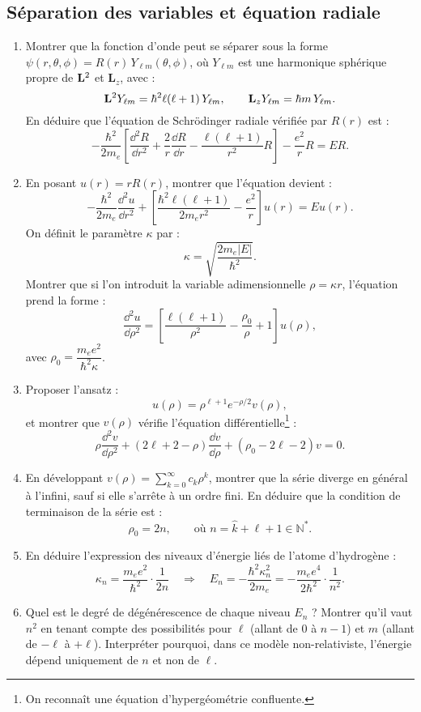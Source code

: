\documentclass[a4paper,10pt]{report}
\begin{document}
\subsection{Séparation des variables et équation radiale}
\begin{enumerate}
	\item Montrer que la fonction d'onde peut se séparer sous la forme $\psi(r,\theta,\phi) = R(r)\, Y_{\ell m}(\theta,\phi)$, où $Y_{\ell m}$ est une harmonique sphérique propre de $\vb{L}^2$ et $\textbf{L}_z$, avec :
	\[
	\vb{L}^2 Y_{\ell m} = \hbar^2 \ell(\ell+1)\, Y_{\ell m}, \qquad \textbf{L}_z Y_{\ell m} = \hbar m\, Y_{\ell m}.
	\]
	En déduire que l’équation de Schrödinger radiale vérifiée par $R(r)$ est :
	\[
	-\frac{\hbar^2}{2m_e} \left[ \frac{\dd^2R}{\dd r^2} + \frac{2}{r}\frac{\dd R}{\dd r} - \frac{\ell(\ell+1)}{r^2} R \right] - \frac{e^2}{r} R = E R.
	\]
	
	\item En posant $u(r) = r R(r)$, montrer que l'équation devient :
	\[
	-\frac{\hbar^2}{2m_e} \frac{\dd ^2u}{\dd r^2} + \left[ \frac{\hbar^2 \ell(\ell+1)}{2m_e r^2} - \frac{e^2}{r} \right] u(r) = E u(r).
	\]
On définit le paramètre $\kappa$ par :
	\[
	\kappa = \sqrt{\frac{2m_e |E|}{\hbar^2}}.
	\]
	Montrer que si l’on introduit la variable adimensionnelle $\rho = \kappa r$, l’équation prend la forme :
	\[
	\frac{\dd ^2 u}{\dd \rho^2} = \left[ \frac{\ell(\ell+1)}{\rho^2} - \frac{\rho_0}{\rho} + 1 \right] u(\rho),
	\]
	avec $\rho_0 = \dfrac{m_e e^2}{\hbar^2 \kappa}$.
	
	\item Proposer l’ansatz :
	\[
	u(\rho) = \rho^{\ell+1} e^{-\rho/2} v(\rho),
	\]
	et montrer que $v(\rho)$ vérifie l’équation différentielle\footnote{On reconnaît une équation d’hypergéométrie confluente.} :
	\[
	\rho \frac{\dd ^2 v}{\dd \rho^2} + (2\ell + 2 - \rho) \frac{\dd v}{\dd \rho} + (\rho_0 - 2\ell - 2) v = 0.
	\]
	
	
	\item En développant $v(\rho) = \sum_{k=0}^\infty c_k \rho^k$, montrer que la série diverge en général à l’infini, sauf si elle s’arrête à un ordre fini. En déduire que la condition de terminaison de la série est :
	\[
	\rho_0 = 2n, \qquad \text{où } n = \hat{k} + \ell + 1 \in \mathbb{N}^*.
	\]
	
	\item En déduire l’expression des niveaux d’énergie liés de l’atome d’hydrogène :
	\[
	\kappa_n = \frac{m_e e^2}{\hbar^2} \cdot \frac{1}{2n}
	\quad \Rightarrow \quad
	E_n = - \frac{\hbar^2 \kappa_n^2}{2 m_e} = - \frac{m_e e^4}{2 \hbar^2} \cdot \frac{1}{n^2}.
	\]
	
	\item Quel est le degré de dégénérescence de chaque niveau $E_n$ ? Montrer qu’il vaut $n^2$ en tenant compte des possibilités pour $\ell$ (allant de $0$ à $n-1$) et $m$ (allant de $-\ell$ à $+\ell$). Interpréter pourquoi, dans ce modèle non-relativiste, l’énergie dépend uniquement de $n$ et non de $\ell$.
\end{enumerate}
\end{document}
